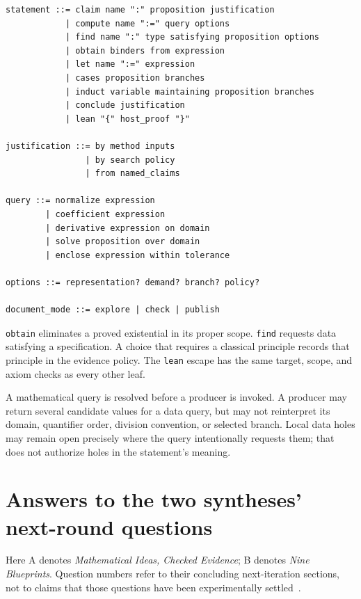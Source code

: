\documentclass[11pt,a4paper]{article}
\newcommand{\code}[1]{\nolinkurl{#1}}
\theoremstyle{definition}
\begin{document}
\par\noindent\begin{minipage}{\linewidth}
\begin{lstlisting}
statement ::= claim name ":" proposition justification
            | compute name ":=" query options
            | find name ":" type satisfying proposition options
            | obtain binders from expression
            | let name ":=" expression
            | cases proposition branches
            | induct variable maintaining proposition branches
            | conclude justification
            | lean "{" host_proof "}"

justification ::= by method inputs
                | by search policy
                | from named_claims

query ::= normalize expression
        | coefficient expression
        | derivative expression on domain
        | solve proposition over domain
        | enclose expression within tolerance

options ::= representation? demand? branch? policy?

document_mode ::= explore | check | publish
\end{lstlisting}
\end{minipage}\par

\code{obtain} eliminates a proved existential in its proper scope. \code{find} requests data satisfying a specification. A choice that requires a classical principle records that principle in the evidence policy. The \code{lean} escape has the same target, scope, and axiom checks as every other leaf.

A mathematical query is resolved before a producer is invoked. A producer may return several candidate values for a data query, but may not reinterpret its domain, quantifier order, division convention, or selected branch. Local data holes may remain open precisely where the query intentionally requests them; that does not authorize holes in the statement's meaning.

\clearpage
\section{Answers to the two syntheses' next-round questions}\label{app:crosswalk}

Here A denotes \emph{Mathematical Ideas, Checked Evidence}; B denotes \emph{Nine Blueprints}. Question numbers refer to their concluding next-iteration sections, not to claims that those questions have been experimentally settled~\cite{synA,synB}.
\end{document}
